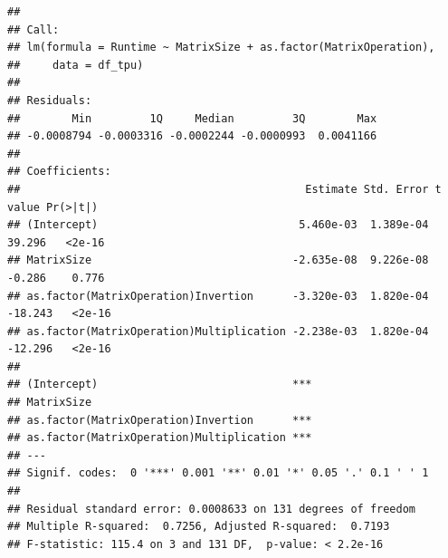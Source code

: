 \documentclass[
]{article}
\newenvironment{Shaded}{\begin{snugshade}}{\end{snugshade}}
\newcommand{\DataTypeTok}[1]{\textcolor[rgb]{0.13,0.29,0.53}{#1}}
\newcommand{\KeywordTok}[1]{\textcolor[rgb]{0.13,0.29,0.53}{\textbf{#1}}}
\newcommand{\NormalTok}[1]{#1}
\newcommand{\OperatorTok}[1]{\textcolor[rgb]{0.81,0.36,0.00}{\textbf{#1}}}
\newcommand{\StringTok}[1]{\textcolor[rgb]{0.31,0.60,0.02}{#1}}
\begin{document}
\begin{Shaded}
\end{Shaded}

\begin{verbatim}
## 
## Call:
## lm(formula = Runtime ~ MatrixSize + as.factor(MatrixOperation), 
##     data = df_tpu)
## 
## Residuals:
##        Min         1Q     Median         3Q        Max 
## -0.0008794 -0.0003316 -0.0002244 -0.0000993  0.0041166 
## 
## Coefficients:
##                                            Estimate Std. Error t value Pr(>|t|)
## (Intercept)                               5.460e-03  1.389e-04  39.296   <2e-16
## MatrixSize                               -2.635e-08  9.226e-08  -0.286    0.776
## as.factor(MatrixOperation)Invertion      -3.320e-03  1.820e-04 -18.243   <2e-16
## as.factor(MatrixOperation)Multiplication -2.238e-03  1.820e-04 -12.296   <2e-16
##                                             
## (Intercept)                              ***
## MatrixSize                                  
## as.factor(MatrixOperation)Invertion      ***
## as.factor(MatrixOperation)Multiplication ***
## ---
## Signif. codes:  0 '***' 0.001 '**' 0.01 '*' 0.05 '.' 0.1 ' ' 1
## 
## Residual standard error: 0.0008633 on 131 degrees of freedom
## Multiple R-squared:  0.7256, Adjusted R-squared:  0.7193 
## F-statistic: 115.4 on 3 and 131 DF,  p-value: < 2.2e-16
\end{verbatim}

\begin{Shaded}
\end{Shaded}
\end{document}
